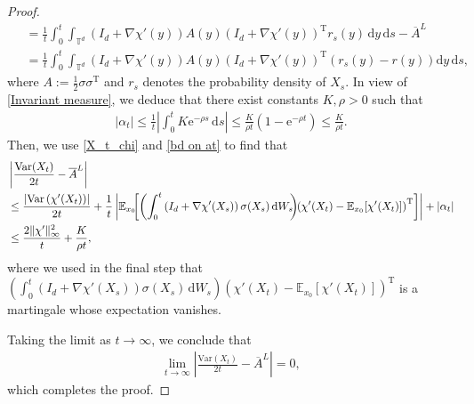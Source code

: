 \documentclass[12pt,a4paper,reqno]{amsart}
\numberwithin{equation}{section}
\begin{document}
\begin{proof}
\begin{align*}
        &\;= \frac{1}{t}\int_0^t\int_{\mathbb{T}^d} \left(I_d + \nabla \chi'(y) \right)A(y) \left(I_d + \nabla \chi'(y) \right)^{\mathrm{T}}r_s(y) \,\mathrm{d}y\, \mathrm{d}s - \overline{A}^L\\
        &\;= \frac{1}{t} \int_0^t\int_{\mathbb{T}^d} \left(I_d + \nabla \chi'(y) \right)A(y) \left(I_d + \nabla \chi'(y) \right)^{\mathrm{T}}\left(r_s(y)-r(y)\right) \mathrm{d}y\, \mathrm{d}s,
\end{align*}
where $A:=\frac{1}{2}\sigma\sigma^{\mathrm{T}}$ and $r_s$ denotes the probability density of $X_s$. In view of \eqref{Invariant measure}, we deduce that there exist constants $K,\rho>0$ such that
\begin{align}\label{bd on at}
    \lvert \alpha_t \rvert \leq \frac{1}{t}\left|\int_0^t K \mathrm{e}^{-\rho s}\,\mathrm{d}s\right| \le \frac{K}{\rho t}(1 - \mathrm{e}^{-\rho t}) \leq \frac{K}{\rho t}.
\end{align}
Then, we use \eqref{X_t_chi} and \eqref{bd on at} to find that
\begin{align}\label{rate 1overt}
\begin{split}
        &\left\lvert\frac{\mathrm{Var}(X_t)}{2t} - \overline{A}^L \right\rvert \\ &\le   
  \frac{\left\lvert \mathrm{Var}\left( \chi'(X_t)\right)\right\rvert}{2t} + \frac{1}{t} \left\lvert \mathbb{E}_{x_0}\hspace{-0.15cm}\left[\left(\int_0^t\left(I_d + \nabla \chi'(X_s)\right)\sigma(X_s)\,\mathrm{d}W_s\hspace{-0.1cm}\right) \hspace{-0.1cm}\left(\chi'(X_t) - \mathbb{E}_{x_0}[\chi'(X_t)]\right)^{\mathrm{T}} \right]\right\rvert + \lvert \alpha_t \rvert \\
        &\le \frac{2\|\chi'\|^2_\infty}{t} + \frac{K}{\rho t},
        \end{split}
    \end{align}
where we used in the final step that $\left(\int_0^t\left(I_d + \nabla \chi'(X_s)\right)\sigma(X_s)\,\mathrm{d}W_s\right)\left(\chi'(X_t) - \mathbb{E}_{x_0}[\chi'(X_t)]\right)^{\mathrm{T}}$ is a martingale whose expectation vanishes.

Taking the limit as $t\rightarrow \infty$, we conclude that
\begin{align*}
    \lim_{t\rightarrow \infty} \left\lvert\frac{\mathrm{Var}(X_t)}{2t} - \overline{A}^L \right\rvert = 0,
\end{align*}
which completes the proof.
\end{proof} 
\end{document}
